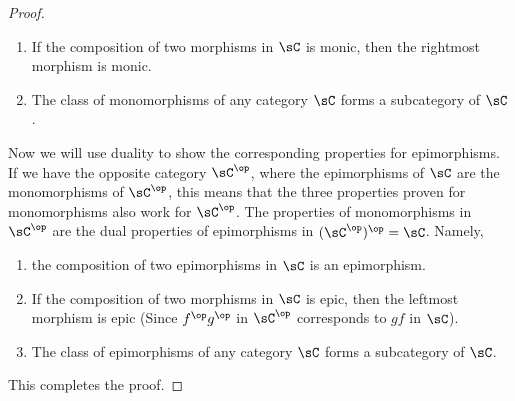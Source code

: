 \documentclass[main.tex]{subfiles}
\begin{document}
\begin{proof}
\begin{enumerate}
		\item If the composition of two morphisms in \(\sC\) is monic, then the
			rightmost morphism is monic.

		\item The class of monomorphisms of any category \(\sC\) forms a
			subcategory of \(\sC\).
	\end{enumerate}

	Now we will use duality to show the corresponding properties for
	epimorphisms. If we have the opposite category \(\sC^{\op}\), where the
	epimorphisms of \(\sC\) are the monomorphisms of \(\sC^{\op}\), this means
	that the three properties proven for monomorphisms also work for
	\(\sC^{\op}\). The properties of monomorphisms in \(\sC^{\op}\) are the dual
	properties of epimorphisms in \((\sC^{\op})^{\op} = \sC\). Namely,
	\begin{enumerate}
		\item the composition of two epimorphisms in \(\sC\) is an epimorphism.

		\item If the composition of two morphisms in \(\sC\) is epic, then the
			leftmost morphism is epic (Since \(f^\op g^\op\) in \(\sC^\op\)
			corresponds to \(gf\) in \(\sC\)).

		\item The class of epimorphisms of any category \(\sC\) forms a
			subcategory of \(\sC\).
	\end{enumerate}
	This completes the proof.
\end{proof}
\end{document}

